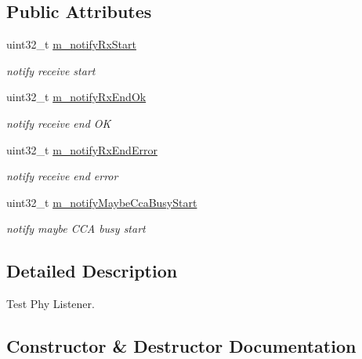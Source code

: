 \subsection*{Public Attributes}
\begin{DoxyCompactItemize}
\item 
uint32\+\_\+t \hyperlink{classTestPhyListener_a96979fcd1bcf02b4b995d657c9c38a69}{m\+\_\+notify\+Rx\+Start}
\begin{DoxyCompactList}\small\item\em notify receive start \end{DoxyCompactList}\item 
uint32\+\_\+t \hyperlink{classTestPhyListener_acd11962c5bf6fdbce50900422869997c}{m\+\_\+notify\+Rx\+End\+Ok}
\begin{DoxyCompactList}\small\item\em notify receive end OK \end{DoxyCompactList}\item 
uint32\+\_\+t \hyperlink{classTestPhyListener_ae7a2d3f6f0e016f7672212968476f6e3}{m\+\_\+notify\+Rx\+End\+Error}
\begin{DoxyCompactList}\small\item\em notify receive end error \end{DoxyCompactList}\item 
uint32\+\_\+t \hyperlink{classTestPhyListener_a89573c858e44046755038d10d0675e39}{m\+\_\+notify\+Maybe\+Cca\+Busy\+Start}
\begin{DoxyCompactList}\small\item\em notify maybe C\+CA busy start \end{DoxyCompactList}\end{DoxyCompactItemize}


\subsection{Detailed Description}
Test Phy Listener. 

\subsection{Constructor \& Destructor Documentation}
